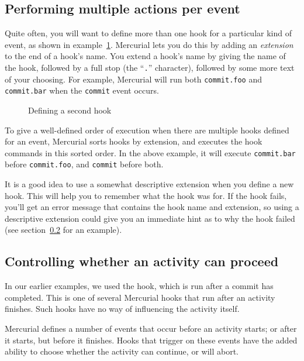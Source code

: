 \subsection{Performing multiple actions per event}

Quite often, you will want to define more than one hook for a
particular kind of event, as shown in example~\ref{ex:hook:ext}.
Mercurial lets you do this by adding an \emph{extension} to the end of
a hook's name.  You extend a hook's name by giving the name of the
hook, followed by a full stop (the ``\texttt{.}'' character), followed
by some more text of your choosing.  For example, Mercurial will run
both \texttt{commit.foo} and \texttt{commit.bar} when the
\texttt{commit} event occurs.

\begin{figure}[ht]
  \caption{Defining a second  hook}
  \label{ex:hook:ext}
\end{figure}

To give a well-defined order of execution when there are multiple
hooks defined for an event, Mercurial sorts hooks by extension, and
executes the hook commands in this sorted order.  In the above
example, it will execute \texttt{commit.bar} before
\texttt{commit.foo}, and \texttt{commit} before both.

It is a good idea to use a somewhat descriptive extension when you
define a new hook.  This will help you to remember what the hook was
for.  If the hook fails, you'll get an error message that contains the
hook name and extension, so using a descriptive extension could give
you an immediate hint as to why the hook failed (see
section~\ref{sec:hook:perm} for an example).

\subsection{Controlling whether an activity can proceed}
\label{sec:hook:perm}

In our earlier examples, we used the  hook, which is
run after a commit has completed.  This is one of several Mercurial
hooks that run after an activity finishes.  Such hooks have no way of
influencing the activity itself.

Mercurial defines a number of events that occur before an activity
starts; or after it starts, but before it finishes.  Hooks that
trigger on these events have the added ability to choose whether the
activity can continue, or will abort.  

